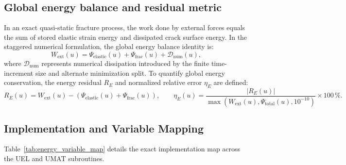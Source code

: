 \subsection{Global energy balance and residual metric}
In an exact quasi-static fracture process, the work done by external forces equals the sum of stored elastic strain energy and dissipated crack surface energy. In the staggered numerical formulation, the global energy balance identity is:
\begin{equation}
W_{\mathrm{ext}}(u) = \Psi_{\mathrm{elastic}}(u) + \Psi_{\mathrm{frac}}(u) + \mathcal{D}_{\mathrm{num}}(u),
\end{equation}
where $\mathcal{D}_{\mathrm{num}}$ represents numerical dissipation introduced by the finite time-increment size and alternate minimization split. To quantify global energy conservation, the energy residual $R_E$ and normalized relative error $\eta_E$ are defined:
\begin{equation}
R_E(u) = W_{\mathrm{ext}}(u) - \left( \Psi_{\mathrm{elastic}}(u) + \Psi_{\mathrm{frac}}(u) \right),
\qquad
\eta_E(u) = \frac{\lvert R_E(u)\rvert}{\max\left(W_{\mathrm{ext}}(u),\Psi_{\mathrm{total}}(u), 10^{-10}\right)} \times 100\,\%.
\label{eq:energy_residual}
\end{equation}

\subsection{Implementation and Variable Mapping}
Table~\ref{tab:energy_variable_map} details the exact implementation map across the UEL and UMAT subroutines.

